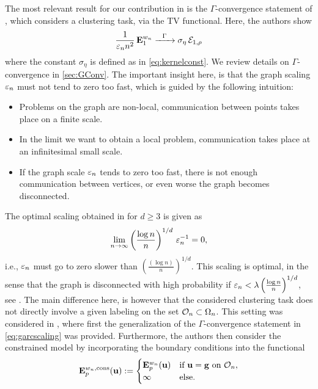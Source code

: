 The most relevant result for our contribution in \cite{roith2022continuum} is the $\Gamma$-convergence statement of \cite{GarcSlep15}, which considers a clustering task, via the TV functional. Here, the authors show 
%
\begin{align*}
\frac{1}{\varepsilon_n n^2}\, \mathbf{E}^{w_n}_1 \xrightarrow{\phantom{-}\Gamma\phantom{-}} \sigma_\eta\, \mathcal{E}_{1,\rho}
\end{align*}
%
where the constant $\sigma_\eta$ is defined as in \cref{eq:kernelconst}. We review details on $\Gamma$-convergence in \cref{sec:GConv}. The important insight here, is that the graph scaling $\varepsilon_n$ must not tend to zero too fast, which is guided by the following intuition:
%
\begin{itemize}
	\item Problems on the graph are non-local, communication between points takes place on a finite scale.
	\item In the limit we want to obtain a local problem, communication takes place at an infinitesimal small scale.
	\item If the graph scale $\varepsilon_n$ tends to zero too fast, there is not enough communication between vertices, or even worse the graph becomes disconnected.
\end{itemize}
%
The optimal scaling obtained in \cite{GarcSlep15} for $d\geq 3$ is given as 
%
\begin{align}\label{eq:garcscaling}
\lim_{n\to\infty} \left(\frac{\log n}{n}\right)^{1/d}\, \varepsilon_n^{-1} = 0,
\end{align}
%
i.e., $\varepsilon_n$ must go to zero slower than $\left(\frac{(\log n)}{n}\right)^{1/d}$. This scaling is optimal, in the sense that the graph is disconnected with high probability if $\varepsilon_n < \lambda \left(\frac{\log n}{n}\right)^{1/d}$, see \cite{GarcSlep15}. The main difference here, is however that the considered clustering task does not directly involve a given labeling on the set $\mathcal{O}_n\subset\Omega_n$. This setting was considered in \cite{slepcev2019analysis}, where first the generalization of the $\Gamma$-convergence statement in \cref{eq:garcscaling} was provided. Furthermore, the authors then consider the constrained  model by incorporating the boundary conditions into the functional
%
\begin{align*}
\mathbf{E}^{w_n, \text{cons}}_p(\mathbf{u}) :=
\begin{cases}
\mathbf{E}^{w_n}_p(\mathbf{u}) &\text{if } \mathbf{u} = \mathbf{g} \text{ on }\mathcal{O}_n,\\
\infty &\text{else}.
\end{cases} 
\end{align*}
